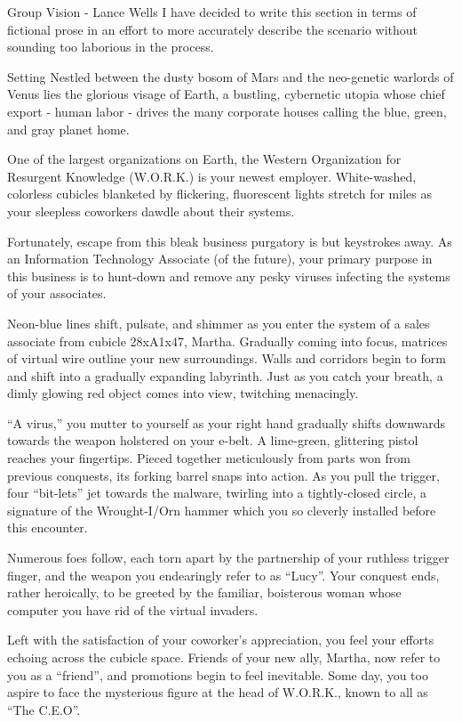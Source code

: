 \documentclass[12pt]{report}
\begin{document}
\begin{section}{Group Vision - Lance Wells}
I have decided to write this section in terms of fictional prose in an 
effort to more accurately describe the scenario without sounding too
laborious in the process.

\begin{subsection}{Setting}
Nestled between the dusty bosom of Mars and the neo-genetic warlords of
Venus lies the glorious visage of Earth, a bustling, cybernetic utopia whose
chief export - human labor - drives the many corporate houses calling the
blue, green, and gray planet home.

One of the largest organizations on Earth, the Western Organization for
Resurgent Knowledge (W.O.R.K.) is your newest employer. White-washed,
colorless cubicles blanketed by flickering, fluorescent lights stretch for
miles as your sleepless coworkers dawdle about their systems.

Fortunately, escape from this bleak business purgatory is but keystrokes
away. As an Information Technology Associate (of the future), your primary
purpose in this business is to hunt-down and remove any pesky viruses
infecting the systems of your associates.

Neon-blue lines shift, pulsate, and shimmer as you enter the system of a
sales associate from cubicle 28xA1x47, Martha. Gradually coming into focus,
matrices of virtual wire outline your new surroundings. Walls and corridors
begin to form and shift into a gradually expanding labyrinth. Just as you
catch your breath, a dimly glowing red object comes into view, twitching
menacingly.

``A virus,'' you mutter to yourself as your right hand gradually shifts
downwards towards the weapon holstered on your e-belt. A lime-green,
glittering pistol reaches your fingertips. Pieced together meticulously from
parts won from previous conquests, its forking barrel snaps into action. As
you pull the trigger, four ``bit-lets'' jet towards the malware, twirling
into a tightly-closed circle, a signature of the Wrought-I/Orn hammer which
you so cleverly installed before this encounter.

Numerous foes follow, each torn apart by the partnership of your ruthless
trigger finger, and the weapon you endearingly refer to as ``Lucy''. Your
conquest ends, rather heroically, to be greeted by the familiar, boisterous
woman whose computer you have rid of the virtual invaders.

Left with the satisfaction of your coworker's appreciation, you feel your
efforts echoing across the cubicle space. Friends of your new ally, Martha,
now refer to you as a ``friend'', and promotions begin to feel inevitable.
Some day, you too aspire to face the mysterious figure at the head of
W.O.R.K., known to all as ``The C.E.O''.
\end{subsection}


\end{section}
\end{document}

